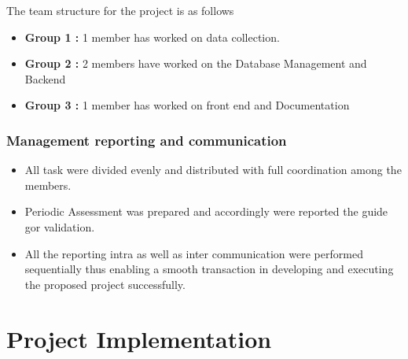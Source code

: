 \documentclass[oneside,a4paper,12pt]{book}
\begin{document}
The team structure for the project is as follows

\begin{itemize}
    \item \textbf{Group 1 :} 1 member has worked on data collection.
    \item \textbf{Group 2 :} 2 members have worked on the Database Management and Backend 
    \item \textbf{Group 3 :} 1 member has worked on front end and Documentation
\end{itemize}
\subsection{Management reporting and communication}
\begin{itemize}
    \item All task were divided evenly and distributed with full coordination among the members.
    \item Periodic Assessment was prepared and accordingly were reported the guide gor validation.
    \item All the reporting intra  as well as inter communication were performed sequentially thus enabling a smooth transaction in developing and executing the proposed project successfully.
\end{itemize}
\chapter{Project Implementation}
\end{document}
